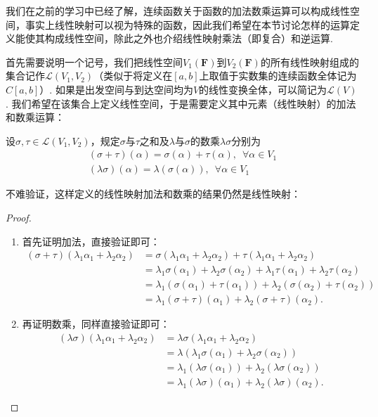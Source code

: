 我们在之前的学习中已经了解，连续函数关于函数的加法数乘运算可以构成线性空间，事实上线性映射可以视为特殊的函数，因此我们希望在本节讨论怎样的运算定义能使其构成线性空间，除此之外也介绍线性映射乘法（即复合）和逆运算.

首先需要说明一个记号，我们把线性空间$V_1(\mathbf{F})$到$V_2(\mathbf{F})$的所有线性映射组成的集合记作$\mathcal{L}(V_1,V_2)$（类似于将定义在$[a,b]$上取值于实数集的连续函数全体记为$C[a,b]$）. 如果是出发空间与到达空间均为$V$的线性变换全体，可以简记为$\mathcal{L}(V)$. 我们希望在该集合上定义线性空间，于是需要定义其中元素（线性映射）的加法和数乘运算：
\begin{definition}{}{}
    设$\sigma,\tau\in \mathcal{L}(V_1,V_2)$，规定$\sigma$与$\tau$之和及$\lambda$与$\sigma$的数乘$\lambda\sigma$分别为
    \begin{gather*}
        (\sigma+\tau)(\alpha)=\sigma(\alpha)+\tau(\alpha),\enspace\forall\alpha\in V_1 \\
        (\lambda\sigma)(\alpha)=\lambda(\sigma(\alpha)),\enspace\forall\alpha\in V_1
    \end{gather*}
\end{definition}

不难验证，这样定义的线性映射加法和数乘的结果仍然是线性映射：
\begin{proof}
\begin{enumerate}
    \item 首先证明加法，直接验证即可：
    \begin{align*}
        (\sigma + \tau)(\lambda_1 \alpha_1 + \lambda_2 \alpha_2) & = \sigma(\lambda_1 \alpha_1 + \lambda_2 \alpha_2) + \tau(\lambda_1 \alpha_1 + \lambda_2 \alpha_2) \\
        & = \lambda_1 \sigma(\alpha_1) + \lambda_2 \sigma(\alpha_2) + \lambda_1 \tau(\alpha_1) + \lambda_2 \tau(\alpha_2) \\
        & = \lambda_1 (\sigma(\alpha_1) + \tau(\alpha_1)) + \lambda_2 (\sigma(\alpha_2) + \tau(\alpha_2)) \\
        &= \lambda_1 (\sigma+\tau)(\alpha_1) + \lambda_2 (\sigma+\tau)(\alpha_2).
    \end{align*}

    \item 再证明数乘，同样直接验证即可：
    \begin{align*}
        (\lambda \sigma)(\lambda_1 \alpha_1 + \lambda_2 \alpha_2) & = \lambda \sigma(\lambda_1 \alpha_1 + \lambda_2 \alpha_2) \\
        & = \lambda (\lambda_1 \sigma(\alpha_1) + \lambda_2 \sigma(\alpha_2)) \\
        & = \lambda_1 (\lambda \sigma(\alpha_1)) + \lambda_2 (\lambda \sigma(\alpha_2)) \\
        & = \lambda_1 (\lambda \sigma)(\alpha_1) + \lambda_2 (\lambda \sigma)(\alpha_2).
    \end{align*}
\end{enumerate}
\end{proof}

